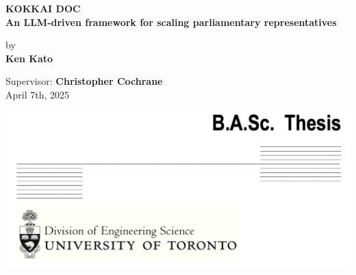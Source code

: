 \documentclass[final,5p,times,twocolumn,authoryear]{elsarticle}
\begin{document}



\onecolumn
\thispagestyle{empty}
	

\begin{center}
	\Large
	\textbf{KOKKAI DOC}\\
	\textbf{An LLM-driven framework for scaling parliamentary representatives}

	\vspace{1.5cm}

	by\\
	\textbf{Ken Kato}

	\vspace{1.5cm}

	Supervisor: \textbf{Christopher Cochrane}\\
	April 7th, 2025

	\vfill %

	\includegraphics[width=\textwidth]{figs/front.png}%

\end{center}
\end{document}
